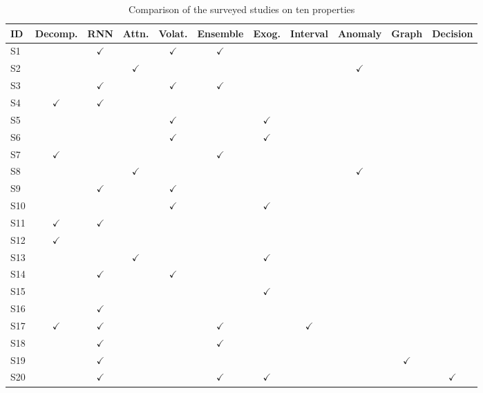 \begin{table}[!t]
\centering
\caption{Comparison of the surveyed studies on ten properties}
\label{tab:survey-matrix}
\footnotesize
\setlength{\tabcolsep}{4.6pt}
\renewcommand{\arraystretch}{1.1}
\begin{tabular}{|l|c|c|c|c|c|c|c|c|c|c|}
\hline
\textbf{ID} & \textbf{Decomp.} & \textbf{RNN} & \textbf{Attn.} & \textbf{Volat.} & \textbf{Ensemble} & \textbf{Exog.} & \textbf{Interval} & \textbf{Anomaly} & \textbf{Graph} & \textbf{Decision} \\ \hline
S1  & & $\checkmark$ & & $\checkmark$ & $\checkmark$ & & & & & \\ \hline
S2  & & & $\checkmark$ & & & & & $\checkmark$ & & \\ \hline
S3  & & $\checkmark$ & & $\checkmark$ & $\checkmark$ & & & & & \\ \hline
S4  & $\checkmark$ & $\checkmark$ & & & & & & & & \\ \hline
S5  & & & & $\checkmark$ & & $\checkmark$ & & & & \\ \hline
S6  & & & & $\checkmark$ & & $\checkmark$ & & & & \\ \hline
S7  & $\checkmark$ & & & & $\checkmark$ & & & & & \\ \hline
S8  & & & $\checkmark$ & & & & & $\checkmark$ & & \\ \hline
S9  & & $\checkmark$ & & $\checkmark$ & & & & & & \\ \hline
S10 & & & & $\checkmark$ & & $\checkmark$ & & & & \\ \hline
S11 & $\checkmark$ & $\checkmark$ & & & & & & & & \\ \hline
S12 & $\checkmark$ & & & & & & & & & \\ \hline
S13 & & & $\checkmark$ & & & $\checkmark$ & & & & \\ \hline
S14 & & $\checkmark$ & & $\checkmark$ & & & & & & \\ \hline
S15 & & & & & & $\checkmark$ & & & & \\ \hline
S16 & & $\checkmark$ & & & & & & & & \\ \hline
S17 & $\checkmark$ & $\checkmark$ & & & $\checkmark$ & & $\checkmark$ & & & \\ \hline
S18 & & $\checkmark$ & & & $\checkmark$ & & & & & \\ \hline
S19 & & $\checkmark$ & & & & & & & $\checkmark$ & \\ \hline
S20 & & $\checkmark$ & & & $\checkmark$ & $\checkmark$ & & & & $\checkmark$ \\ \hline

\end{tabular}
\end{table}
